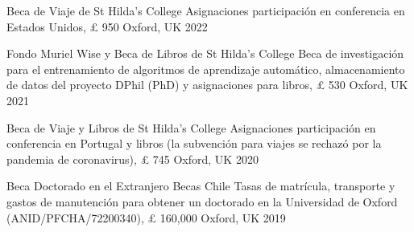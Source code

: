





\vspace{1mm}

\begin{cvhonors}
\cvhonor
{Beca de Viaje de St Hilda's College} 
{Asignaciones participación en conferencia en Estados Unidos, {\pounds} 950} 
{Oxford, UK}
{2022}
\end{cvhonors}

\vspace{1mm}

\begin{cvhonors}
\cvhonor
{Fondo Muriel Wise y Beca de Libros de St Hilda's College} 
{Beca de investigación para el entrenamiento de algoritmos de aprendizaje automático, almacenamiento de datos del proyecto DPhil (PhD) y
asignaciones para libros, {\pounds} 530} 
{Oxford, UK}
{2021}
\end{cvhonors}

\vspace{1mm}

\begin{cvhonors}
\cvhonor
{Beca de Viaje y Libros de St Hilda's College} 
{Asignaciones participación en conferencia en Portugal y libros (la subvención para viajes se rechazó por la pandemia de coronavirus), {\pounds} 745} 
{Oxford, UK}
{2020}
\end{cvhonors}

\vspace{1mm}

\begin{cvhonors}
\cvhonor
{Beca Doctorado en el Extranjero Becas Chile} 
{Tasas de matrícula, transporte y gastos de manutención para obtener un doctorado en la Universidad de Oxford (ANID/PFCHA/72200340), {\pounds} 160,000}
{Oxford, UK}
{2019}
\end{cvhonors}

